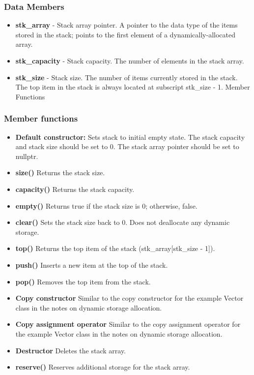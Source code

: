 \documentclass{report}
\begin{document}
     \subsubsection{Data Members}
     \begin{itemize}
         \item \textbf{stk\_array} - Stack array pointer. A pointer to the data type of the items stored in the stack; points to the first element of a dynamically-allocated array.
         \item \textbf{stk\_capacity} - Stack capacity. The number of elements in the stack array.
         \item \textbf{stk\_size} - Stack size. The number of items currently stored in the stack. The top item in the stack is always located at subscript stk\_size - 1. Member Functions
     \end{itemize}
     \bigbreak \noindent 
     \subsubsection{Member functions}
     \begin{itemize}
         \item \textbf{Default constructor:} Sets stack to initial empty state. The stack capacity and stack size should be set to 0. The stack array pointer should be set to nullptr.
         \item \textbf{size()} Returns the stack size.
         \item \textbf{capacity()} Returns the stack capacity.
         \item \textbf{empty()} Returns true if the stack size is 0; otherwise, false.
         \item \textbf{clear()} Sets the stack size back to 0. Does not deallocate any dynamic storage.
         \item \textbf{top()} Returns the top item of the stack (stk\_array[stk\_size - 1]).
         \item \textbf{push()} Inserts a new item at the top of the stack.
         \item \textbf{pop()} Removes the top item from the stack.
         \item \textbf{Copy constructor} Similar to the copy constructor for the example Vector class in the notes on dynamic storage allocation.
         \item \textbf{Copy assignment operator} Similar to the copy assignment operator for the example Vector class in the notes on dynamic storage allocation.
         \item \textbf{Destructor} Deletes the stack array.
         \item \textbf{reserve()} Reserves additional storage for the stack array.
     \end{itemize}
\end{document}
